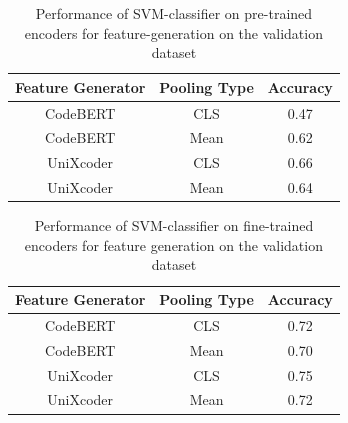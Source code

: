 
\begin{table}[H]
    \caption{Performance of SVM-classifier on pre-trained encoders for feature-generation on the validation dataset}
    \label{tab:validation_perfomance_pre_svm}
    \begin{center}
        \begin{tabular}{c|c|c}
            \textbf{Feature Generator} & \textbf{Pooling Type} & \textbf{Accuracy }\\
            \hline
            CodeBERT & CLS &  0.47 \\
            CodeBERT & Mean &  0.62 \\
            UniXcoder & CLS &  0.66 \\
            UniXcoder & Mean & 0.64 \\
        \end{tabular}
    \end{center}
\end{table}


\begin{table}[H]
    \caption{Performance of SVM-classifier on fine-trained encoders for feature generation on the validation dataset}
    \label{tab:validation_perfomance_fine_svm}
    \begin{center}
        \begin{tabular}{c|c|c}
            \textbf{Feature Generator} & \textbf{Pooling Type} & \textbf{Accuracy }\\
            \hline
            CodeBERT & CLS &  0.72 \\
            CodeBERT & Mean & 0.70 \\
            UniXcoder & CLS &  0.75 \\
            UniXcoder & Mean &  0.72 \\
        \end{tabular}
    \end{center}
\end{table}


